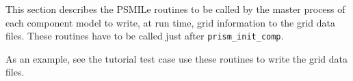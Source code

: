 

This section describes the PSMILe routines to be called by the
master process of each component model to write, at run time,
grid information to the grid data files. These routines have to
be called just after {\tt prism\_init\_comp}.

As an example, see the tutorial test case
use these routines to write the grid data
files.


